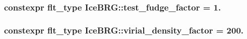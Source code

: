 \subsubsection[{test\+\_\+fudge\+\_\+factor}]{\setlength{\rightskip}{0pt plus 5cm}constexpr {\bf flt\+\_\+type} Ice\+B\+R\+G\+::test\+\_\+fudge\+\_\+factor = 1.}\label{namespaceIceBRG_ada4d38aafd54f8dff69cf92960cfa2a9}
\hypertarget{namespaceIceBRG_aefc8a3f77d90888480c87cde4e641f9e}{}
\subsubsection[{virial\+\_\+density\+\_\+factor}]{\setlength{\rightskip}{0pt plus 5cm}constexpr {\bf flt\+\_\+type} Ice\+B\+R\+G\+::virial\+\_\+density\+\_\+factor = 200.}\label{namespaceIceBRG_aefc8a3f77d90888480c87cde4e641f9e}
